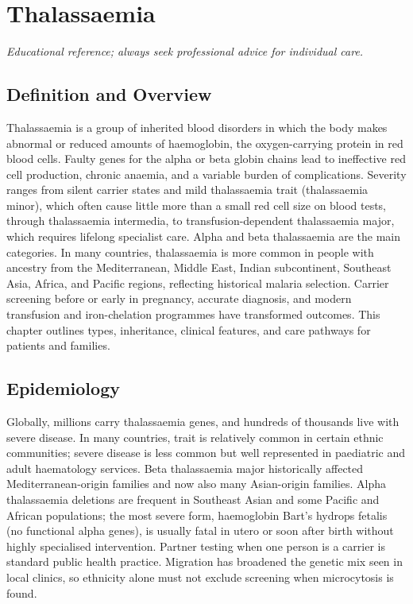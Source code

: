 \chapter{Thalassaemia}

\medskip
\noindent\textit{Educational reference; always seek professional advice for individual care.}

\section*{Definition and Overview}
Thalassaemia is a group of inherited blood disorders in which the body makes abnormal or reduced amounts of haemoglobin, the oxygen-carrying protein in red blood cells. Faulty genes for the alpha or beta globin chains lead to ineffective red cell production, chronic anaemia, and a variable burden of complications. Severity ranges from silent carrier states and mild thalassaemia trait (thalassaemia minor), which often cause little more than a small red cell size on blood tests, through thalassaemia intermedia, to transfusion-dependent thalassaemia major, which requires lifelong specialist care. Alpha and beta thalassaemia are the main categories. In many countries, thalassaemia is more common in people with ancestry from the Mediterranean, Middle East, Indian subcontinent, Southeast Asia, Africa, and Pacific regions, reflecting historical malaria selection. Carrier screening before or early in pregnancy, accurate diagnosis, and modern transfusion and iron-chelation programmes have transformed outcomes. This chapter outlines types, inheritance, clinical features, and care pathways for patients and families.

\section*{Epidemiology}
Globally, millions carry thalassaemia genes, and hundreds of thousands live with severe disease. In many countries, trait is relatively common in certain ethnic communities; severe disease is less common but well represented in paediatric and adult haematology services. Beta thalassaemia major historically affected Mediterranean-origin families and now also many Asian-origin families. Alpha thalassaemia deletions are frequent in Southeast Asian and some Pacific and African populations; the most severe form, haemoglobin Bart's hydrops fetalis (no functional alpha genes), is usually fatal in utero or soon after birth without highly specialised intervention. Partner testing when one person is a carrier is standard public health practice. Migration has broadened the genetic mix seen in local clinics, so ethnicity alone must not exclude screening when microcytosis is found.

